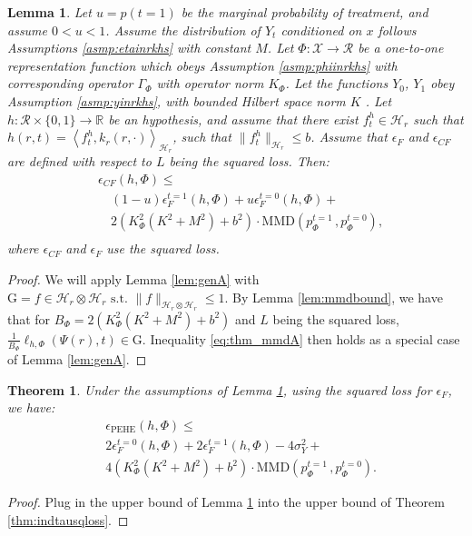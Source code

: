 \documentclass{article}
\newtheorem{thmappthm}{Theorem}
\newtheorem{thmapplem}{Lemma}
\def\cX{\mathcal X}
\def\cH{\mathcal H}
\def\cF{\mathrm{G}}
\def\cR{\mathcal{R}}
\def \R{\mathbb{R}}
\def \epehe{\epsilon_{\text{PEHE}}}
\newcommand{\pc}{p^{t=0}}
\newcommand{\pt}{p^{t=1}}
\newcommand{\lythr}{\ell_{h,\Phi}(\Psi(r),t)}
\newcommand{\GP}{\Gamma_\Phi}
\begin{document}
\begin{thmapplem}\label{thm:mmdA}
Let $u = p(t=1)$ be the marginal probability of treatment, and assume $0<u<1$. Assume the distribution of $Y_t$ conditioned on $x$ follows Assumptions \ref{asmp:etainrkhs} with constant $M$.
Let $\Phi : \cX \rightarrow \cR$ be a one-to-one representation function which obeys Assumption \ref{asmp:phiinrkhs} with corresponding operator $\GP$ with operator norm $K_\Phi$. Let the functions $Y_0$, $Y_1$ obey Assumption \ref{asmp:yinrkhs}, with bounded Hilbert space norm $K$ . Let $h : \cR \times \{0,1\} \rightarrow \R$ be an hypothesis, and assume that there exist $f^h_t \in \cH_r$ such that $h(r,t) = \left<f^h_t,k_r(r,\cdot)\right>_{\cH_r}$, such that $\|f^h_t\|_{\cH_r} \leq b$. Assume that $\epsilon_F$ and $\epsilon_{CF}$ are defined with respect to $L$ being the squared loss. Then:
\begin{align}\label{eq:thm_mmdA}
&\epsilon_{CF}(h,\Phi) \leq \nonumber\\
&\quad (1-u)  \epsilon^{t=1}_F(h,\Phi) + u  \epsilon^{t=0}_F(h,\Phi)  + \nonumber\\
& \quad 2 \left(K_\Phi^2 (K^2 +M^2) + b^2\right)  \cdot \text{MMD}(\pt_\Phi\, ,  \pc_\Phi),\nonumber\\
\end{align}
where $\epsilon_{CF}$ and $\epsilon_F$ use the squared loss.
\end{thmapplem}
\begin{proof}
We will apply Lemma \ref{lem:genA} with $\cF = {f \in \cH_r \otimes \cH_r \text{ s.t. } \|f\|_{\cH_r \otimes \cH_r} \leq 1}$. By Lemma \ref{lem:mmdbound}, we have that for $B_\Phi = 2\left(K_\Phi^2 (K^2+M^2) + b^2\right)$ and $L$ being the squared loss, $\frac{1}{B_\Phi} \lythr \in \cF$. Inequality \eqref{eq:thm_mmdA} then holds as a special case of Lemma \ref{lem:genA}.
\end{proof}

\begin{thmappthm}
Under the assumptions of Lemma \ref{thm:mmdA}, using the squared loss for $\epsilon_F$, we have:
\begin{align*}
&\epehe(h,\Phi) \leq \nonumber \\
&2 \epsilon^{t=0}_F(h,\Phi)  + 2\epsilon^{t=1}_F(h,\Phi)  - 4\sigma^2_Y +  \nonumber \\
&4 \left(K_\Phi^2 (K^2 +M^2) + b^2\right)  \cdot \text{MMD}( \pt_\Phi \, , \pc_\Phi) .
\end{align*}
\end{thmappthm}
\begin{proof}
Plug in the upper bound of Lemma \ref{thm:mmdA} into the upper bound of Theorem \ref{thm:indtausqloss}.
\end{proof}
\end{document}
